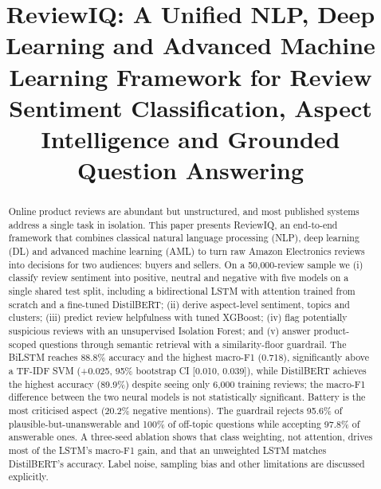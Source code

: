 \documentclass[conference]{IEEEtran}
\begin{document}
\title{ReviewIQ: A Unified NLP, Deep Learning and Advanced Machine Learning Framework for Review Sentiment Classification, Aspect Intelligence and Grounded Question Answering}

\author{
\and
{}
}

\maketitle

\begin{abstract}
Online product reviews are abundant but unstructured, and most published systems address a single task in isolation. This paper presents ReviewIQ, an end-to-end framework that combines classical natural language processing (NLP), deep learning (DL) and advanced machine learning (AML) to turn raw Amazon Electronics reviews into decisions for two audiences: buyers and sellers. On a 50{,}000-review sample we (i) classify review sentiment into positive, neutral and negative with five models on a single shared test split, including a bidirectional LSTM with attention trained from scratch and a fine-tuned DistilBERT; (ii) derive aspect-level sentiment, topics and clusters; (iii) predict review helpfulness with tuned XGBoost; (iv) flag potentially suspicious reviews with an unsupervised Isolation Forest; and (v) answer product-scoped questions through semantic retrieval with a similarity-floor guardrail. The BiLSTM reaches 88.8\% accuracy and the highest macro-F1 (0.718), significantly above a TF-IDF SVM (+0.025, 95\% bootstrap CI [0.010, 0.039]), while DistilBERT achieves the highest accuracy (89.9\%) despite seeing only 6{,}000 training reviews; the macro-F1 difference between the two neural models is not statistically significant. Battery is the most criticised aspect (20.2\% negative mentions). The guardrail rejects 95.6\% of plausible-but-unanswerable and 100\% of off-topic questions while accepting 97.8\% of answerable ones. A three-seed ablation shows that class weighting, not attention, drives most of the LSTM's macro-F1 gain, and that an unweighted LSTM matches DistilBERT's accuracy. Label noise, sampling bias and other limitations are discussed explicitly.
\end{abstract}
\end{document}
